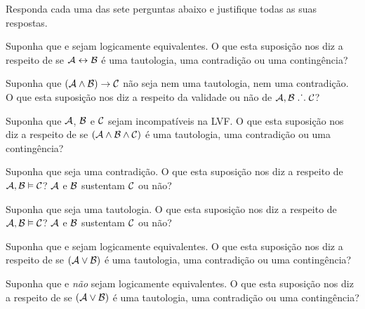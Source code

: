 \solutions
\problempart
\label{pr.TT.concepts}
Responda cada uma das sete perguntas abaixo e justifique todas as suas respostas.
\begin{earg}
\item Suponha que   e  sejam logicamente equivalentes.
O que esta suposição nos diz a respeito de se $\mathcal{A}\leftrightarrow\mathcal{B}$ é uma tautologia, uma contradição ou uma contingência?
\item Suponha que $(\mathcal{A}\wedge\mathcal{B})\rightarrow\mathcal{C}$ não seja nem uma tautologia, nem uma contradição.
O que esta suposição nos diz a respeito da validade ou não de $\mathcal{A}, \mathcal{B} \mathrel{\ldotp\dot{}\,\ldotp}\mathcal{C}$?
\item Suponha que  $\mathcal{A}$, $\mathcal{B}$ e $\mathcal{C}$ sejam incompatíveis na LVF.
O que esta suposição nos diz a respeito de se $(\mathcal{A}\wedge\mathcal{B}\wedge\mathcal{C})$ é uma tautologia, uma contradição ou uma contingência?
\item Suponha que  seja uma contradição.
O que esta suposição nos diz a respeito de $\mathcal{A}, \mathcal{B} \vDash \mathcal{C}$?
$\mathcal{A}$ e $\mathcal{B}$ sustentam $\mathcal{C}$ ou não?
\item Suponha que  seja uma tautologia. 
O que esta suposição nos diz a respeito de $\mathcal{A}, \mathcal{B}\vDash \mathcal{C}$?
$\mathcal{A}$ e $\mathcal{B}$ sustentam $\mathcal{C}$ ou não?
\item Suponha que  e  sejam logicamente equivalentes.
O que esta suposição nos diz a respeito de se $(\mathcal{A}\vee\mathcal{B})$ é uma tautologia, uma contradição ou uma contingência?
\item Suponha que   e  \emph{não} sejam logicamente equivalentes.
O que esta suposição nos diz a respeito de se $(\mathcal{A}\vee\mathcal{B})$ é uma tautologia, uma contradição ou uma contingência?
\end{earg}
